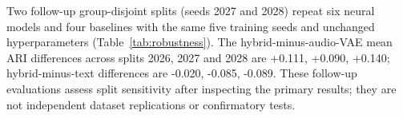 Two follow-up group-disjoint splits (seeds 2027 and 2028) repeat six neural models and four baselines with the same five training seeds and unchanged hyperparameters (Table~\ref{tab:robustness}). The hybrid-minus-audio-VAE mean ARI differences across splits 2026, 2027 and 2028 are +0.111, +0.090, +0.140; hybrid-minus-text differences are -0.020, -0.085, -0.089. These follow-up evaluations assess split sensitivity after inspecting the primary results; they are not independent dataset replications or confirmatory tests.
